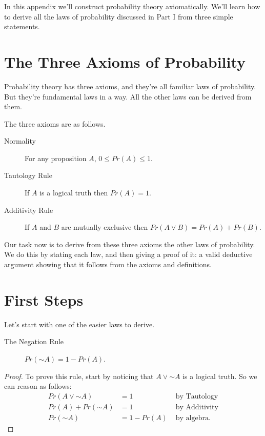 \documentclass[justified]{tufte-book}
\renewcommand{\neg}{\mathbin{\sim}}
\newcommand{\p}{Pr}
\theoremstyle{definition}
\theoremstyle{definition}
\theoremstyle{definition}
\theoremstyle{definition}
\theoremstyle{remark}
\begin{document}
In this appendix we'll construct probability theory axiomatically. We'll learn how to derive all the laws of probability discussed in Part I from three simple statements.

\hypertarget{the-three-axioms-of-probability}{%
\section*{The Three Axioms of Probability}\label{the-three-axioms-of-probability}}

Probability theory has three axioms, and they're all familiar laws of probability. But they're fundamental laws in a way. All the other laws can be derived from them.

The three axioms are as follows.

\begin{description}
\item[Normality]
For any proposition \(A\), \(0 \leq \p(A) \leq 1\).
\item[Tautology Rule]
If \(A\) is a logical truth then \(\p(A) = 1\).
\item[Additivity Rule]
If \(A\) and \(B\) are mutually exclusive then \(\p(A \vee B) = \p(A) + \p(B)\).
\end{description}

Our task now is to derive from these three axioms the other laws of probability. We do this by stating each law, and then giving a proof of it: a valid deductive argument showing that it follows from the axioms and definitions.

\hypertarget{first-steps}{%
\section*{First Steps}\label{first-steps}}

Let's start with one of the easier laws to derive.

\begin{description}
\item[The Negation Rule]
\(\p(\neg A) = 1 - \p(A)\).
\end{description}

\begin{proof}
{}
To prove this rule, start by noticing that \(A \vee \neg A\) is a logical truth. So we can reason as follows:
\[
  \begin{aligned}
  \p(A \vee \neg A)  &= 1                 & \mbox{ by Tautology}\\
  \p(A) + \p(\neg A) &= 1                 & \mbox{ by Additivity}\\
  \p(\neg A)         &= 1 - \p(A)         & \mbox{ by algebra.}
  \end{aligned}
\]
\end{proof}
\end{document}
